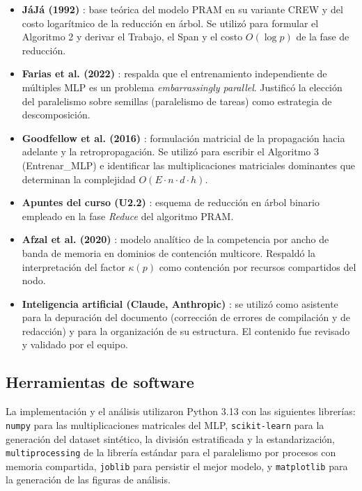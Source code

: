 \documentclass[11pt, a4paper]{article}
\begin{document}
\begin{itemize}
    \item \textbf{JáJá (1992)} \cite{jaja1992parallel}: base teórica del modelo PRAM en su variante CREW y del costo logarítmico de la reducción en árbol. Se utilizó para formular el Algoritmo 2 y derivar el Trabajo, el Span y el costo $O(\log p)$ de la fase de reducción.
    \item \textbf{Farias et al. (2022)} \cite{farias2022parallelmlps}: respalda que el entrenamiento independiente de múltiples MLP es un problema \textit{embarrassingly parallel}. Justificó la elección del paralelismo sobre semillas (paralelismo de tareas) como estrategia de descomposición.
    \item \textbf{Goodfellow et al. (2016)} \cite{goodfellow2016deep}: formulación matricial de la propagación hacia adelante y la retropropagación. Se utilizó para escribir el Algoritmo 3 (Entrenar\_MLP) e identificar las multiplicaciones matriciales dominantes que determinan la complejidad $O(E \cdot n \cdot d \cdot h)$.
    \item \textbf{Apuntes del curso (U2.2)} \cite{u2.2}: esquema de reducción en árbol binario empleado en la fase \textit{Reduce} del algoritmo PRAM.
    \item \textbf{Afzal et al. (2020)} \cite{afzal2020bandwidth}: modelo analítico de la competencia por ancho de banda de memoria en dominios de contención multicore. Respaldó la interpretación del factor $\kappa(p)$ como contención por recursos compartidos del nodo.
    \item \textbf{Inteligencia artificial (Claude, Anthropic)} \cite{claude}: se utilizó como asistente para la depuración del documento (corrección de errores de compilación y de redacción) y para la organización de su estructura. El contenido fue revisado y validado por el equipo.
\end{itemize}

\subsection*{Herramientas de software}

La implementación y el análisis utilizaron Python 3.13 con las siguientes librerías: \texttt{numpy} \cite{numpy} para las multiplicaciones matricales del MLP, \texttt{scikit-learn} \cite{sclearn} para la generación del dataset sint\'etico, la divisi\'on estratificada y la estandarizaci\'on, \texttt{multiprocessing} de la librer\'ia est\'andar para el paralelismo por procesos con memoria compartida, \texttt{joblib} \cite{joblib} para persistir el mejor modelo, y \texttt{matplotlib} \cite{matplotlib} para la generaci\'on de las figuras de an\'alisis.
\end{document}
